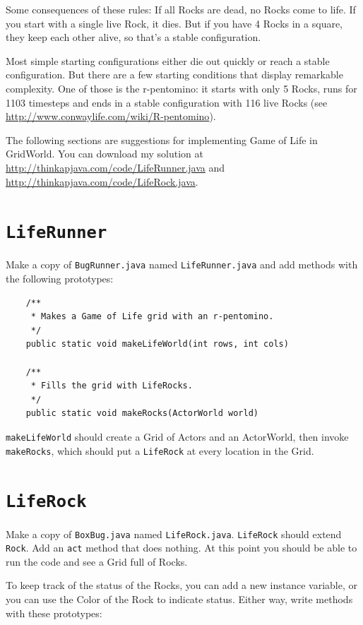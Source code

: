 Some consequences of these rules:
If all Rocks are dead, no Rocks come to life.  If you start with a
single live Rock, it dies.  But if you have 4 Rocks in a square, they
keep each other alive, so that's a stable configuration.

Most simple starting configurations either die out quickly or reach a
stable configuration.  But there are a few starting conditions that
display remarkable complexity.  One of those is the r-pentomino: it
starts with only 5 Rocks, runs for 1103 timesteps and ends in a stable
configuration with 116 live Rocks (see
\url{http://www.conwaylife.com/wiki/R-pentomino}).

The following sections are suggestions for implementing Game of Life
in GridWorld.  You can download my solution at
\url{http://thinkapjava.com/code/LifeRunner.java} and
\url{http://thinkapjava.com/code/LifeRock.java}.


\section{{\tt LifeRunner}}

Make a copy of {\tt BugRunner.java} named {\tt LifeRunner.java}
and add methods with the following prototypes:

\begin{lstlisting}
    /**
     * Makes a Game of Life grid with an r-pentomino.
     */
    public static void makeLifeWorld(int rows, int cols)

    /**
     * Fills the grid with LifeRocks.
     */
    public static void makeRocks(ActorWorld world)
\end{lstlisting}

{\tt makeLifeWorld} should create a Grid of Actors and an ActorWorld,
then invoke {\tt makeRocks}, which should put a {\tt LifeRock} at
every location in the Grid.


\section{{\tt LifeRock}}

Make a copy of {\tt BoxBug.java} named {\tt LifeRock.java}.
{\tt LifeRock} should extend {\tt Rock}.  Add an {\tt act} method
that does nothing.  At this point you should be able to run the
code and see a Grid full of Rocks.

To keep track of the status of the Rocks, you can add a new instance
variable, or you can use the Color of the Rock to indicate status.
Either way, write methods with these prototypes:

